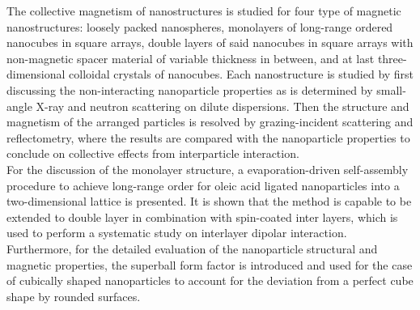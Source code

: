\documentclass[\main/dresen_thesis.tex]{subfiles}
\begin{document}
  The collective magnetism of nanostructures is studied for four type of magnetic nanostructures: loosely packed nanospheres, monolayers of long-range ordered nanocubes in square arrays, double layers of said nanocubes in square arrays with non-magnetic spacer material of variable thickness in between, and at last three-dimensional colloidal crystals of nanocubes.
  Each nanostructure is studied by first discussing the non-interacting nanoparticle properties as is determined by small-angle X-ray and neutron scattering on dilute dispersions.
  Then the structure and magnetism of the arranged particles is resolved by grazing-incident scattering and reflectometry, where the results are compared with the nanoparticle properties to conclude on collective effects from interparticle interaction.
  \\

  For the discussion of the monolayer structure, a evaporation-driven self-assembly procedure to achieve long-range order for oleic acid ligated nanoparticles into a two-dimensional lattice is presented.
  It is shown that the method is capable to be extended to double layer in combination with spin-coated inter layers, which is used to perform a systematic study on interlayer dipolar interaction.
  Furthermore, for the detailed evaluation of the nanoparticle structural and magnetic properties, the superball form factor is introduced and used for the case of cubically shaped nanoparticles to account for the deviation from a perfect cube shape by rounded surfaces.
\end{document}
